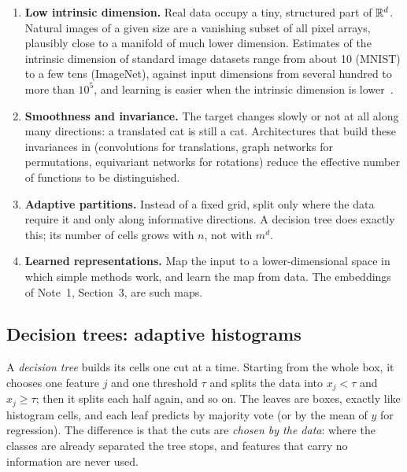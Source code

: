 \documentclass[11pt]{article}
\begin{document}
\begin{enumerate}
\item \textbf{Low intrinsic dimension.} Real data occupy a tiny, structured part of $\mathbb{R}^d$. Natural images of a given
size are a vanishing subset of all pixel arrays, plausibly close to a manifold of much lower dimension. Estimates
of the intrinsic dimension of standard image datasets range from about 10 (MNIST) to a few tens (ImageNet), against
input dimensions from several hundred to more than $10^5$, and learning is easier when the intrinsic dimension is
lower~\cite{pope2021}.
\item \textbf{Smoothness and invariance.} The target changes slowly or not at all along many directions: a
translated cat is still a cat. Architectures that build these invariances in (convolutions for translations,
graph networks for permutations, equivariant networks for rotations) reduce the effective number of functions to be
distinguished.
\item \textbf{Adaptive partitions.} Instead of a fixed grid, split only where the data require it and only along
informative directions. A decision tree does exactly this; its number of cells grows with $n$, not with $m^d$.
\item \textbf{Learned representations.} Map the input to a lower-dimensional space in which simple methods work,
and learn the map from data. The embeddings of Note~1, Section~3, are such maps.
\end{enumerate}

\subsection{Decision trees: adaptive histograms}\label{sec:trees}

A \emph{decision tree} builds its cells one cut at a time. Starting from the whole box, it chooses one feature $j$
and one threshold $\tau$ and splits the data into $x_j < \tau$ and $x_j \ge \tau$; then it splits each half again, and so on.
The leaves are boxes, exactly like histogram cells, and each leaf predicts by majority vote (or by the mean of $y$
for regression). The difference is that the cuts are \emph{chosen by the data}: where the classes are already
separated the tree stops, and features that carry no information are never used.
\end{document}
